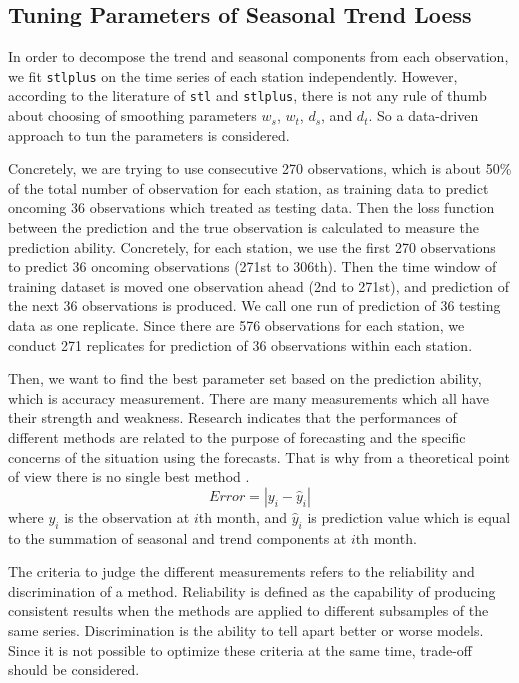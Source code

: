 \subsection{Tuning Parameters of Seasonal Trend Loess}

In order to decompose the trend and seasonal components from each observation, we 
fit \texttt{stlplus} on the time series of each station independently. However,
according to the literature of \texttt{stl} and \texttt{stlplus}, there is not 
any rule of thumb about choosing of smoothing parameters $w_s$, $w_t$, $d_s$, and 
$d_t$. So a data-driven approach to tun the parameters is considered. 

Concretely, we are trying to use consecutive 270 observations, which is about 
50\% of the total number of observation for each station, as training 
data to predict oncoming 36 observations which treated as testing data. Then the 
loss function between the prediction and the true observation is calculated to 
measure the prediction ability. Concretely, for 
each station, we use the first 270 observations to predict 36 oncoming 
observations (271st to 306th). Then the time window of training dataset is moved 
one observation ahead (2nd to 271st), and prediction of the next 36 observations 
is produced. We call one run of prediction of 36 testing data as one replicate. 
Since there are 576 observations for each station, we conduct 271 replicates for 
prediction of 36 observations within each station.

Then, we want to find the best parameter set based on the prediction ability,
which is accuracy measurement. 
There are many measurements which all have their strength and weakness. 
Research indicates that the performances of different methods are related to the
purpose of forecasting and the specific concerns of the situation using the 
forecasts. 
That is why from a theoretical point of view there is no single best method 
\cite{brockwell2002introduction}.
$$
Error = | y_i - \hat y_i |
$$
where $y_i$ is the observation at $i$th month, and $\hat y_i$ is prediction value
which is equal to the summation of seasonal and trend components at $i$th month.

The criteria to judge the different measurements refers to the reliability and
discrimination of a method. Reliability is defined as the capability of producing 
consistent results when the methods are applied to different subsamples of the 
same series. Discrimination is the ability to tell apart better or worse models. 
Since it is not possible to optimize these criteria at the same time, trade-off 
should be considered.

